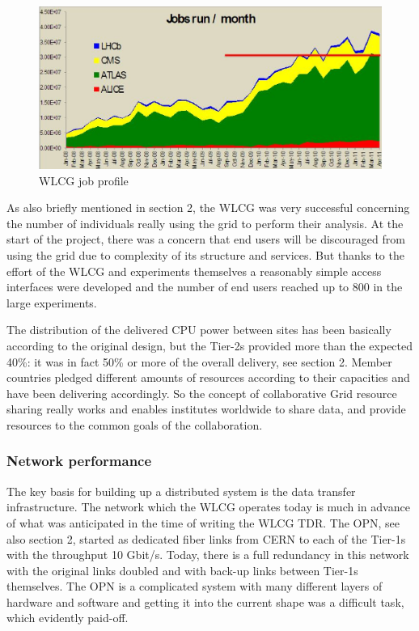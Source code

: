 \begin{figure}[htb] %
\centering
\includegraphics[width=13cm]{fig19.eps} %
\caption{WLCG job profile}\label{fig19}
\end{figure}



As also briefly mentioned in section 2, the WLCG was very successful
concerning the number of individuals really using the grid to
perform their analysis. At the start of the project, there was a
concern that end users will be discouraged from using the grid due
to complexity of its structure and services. But thanks to the
effort of the WLCG and experiments themselves a reasonably simple
access interfaces were developed and the number of end users reached
up to 800 in the large experiments.

The distribution of the delivered CPU power between sites has been
basically according to the original design, but the Tier-2s provided
more than the expected 40\%: it was in fact 50\% or more of the
overall delivery, see section 2. Member countries pledged different
amounts of resources according to their capacities and have been
delivering accordingly.  So the concept of collaborative Grid
resource sharing really works and enables institutes worldwide to
share data, and provide resources to the common goals of the
collaboration.

\subsubsection{Network performance}
%
The key basis for building up a distributed system is the data
transfer infrastructure. The network which the WLCG operates today
is much in advance of what was anticipated in the time of writing
the WLCG TDR. The OPN, see also section 2, started as dedicated
fiber links from CERN to each of the Tier-1s with the throughput 10
Gbit/s. Today, there is a full redundancy in this network with the
original links doubled and with back-up links between Tier-1s
themselves. The OPN is a complicated system with many different
layers of hardware and software and getting it into the current
shape was a difficult task, which evidently paid-off.

